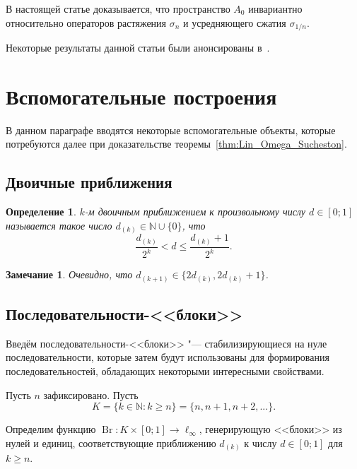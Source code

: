 \documentclass[a4paper,14pt]{article} %
\theoremstyle{plain}
\newtheorem{remark}[lemma]{Замечание}
\newtheorem{definition}[lemma]{Определение}
\begin{document}
В настоящей статье доказывается,
что пространство $A_0$ инвариантно относительно операторов растяжения $\sigma_n$
и усредняющего сжатия $\sigma_{1/n}$.


Некоторые результаты данной статьи были анонсированы в~\cite{our-mz2021linearhulls}.

\section{Вспомогательные построения}

В данном параграфе вводятся некоторые вспомогательные объекты,
которые потребуются далее при доказательстве теоремы~\ref{thm:Lin_Omega_Sucheston}.

\subsection{Двоичные приближения}

\begin{definition}
	$k$-м двоичным приближением к произвольному числу $d\in[0;1]$
	называется такое число $d_{(k)}\in\mathbb{N}\cup\{0\}$,
	что
	\begin{equation}
		\label{eq:binary_approximations_for_number}
		\frac{d_{(k)}}{2^k} < d \leq \frac{d_{(k)}+1}{2^k}
		.
	\end{equation}
\end{definition}

\begin{remark}
	Очевидно, что $d_{(k+1)}\in\{2d_{(k)},2d_{(k)}+1\}$.
\end{remark}

\subsection{Последовательности-<<блоки>>}

Введём последовательности-<<блоки>> "---
стабилизирующиеся на нуле последовательности,
которые затем будут использованы для формирования последовательностей,
обладающих некоторыми интересными свойствами.

Пусть $n$ зафиксировано.
Пусть
\begin{equation}
	K = \{k\in\mathbb{N} : k \geq n\} = \{n, n+1, n+2, ...\}
	.
\end{equation}


Определим функцию $\operatorname{Br}:K\times [0;1] \to \ell_\infty$,
генерирующую <<блоки>> из нулей и единиц,
соответствующие приближению $d_{(k)}$ к числу $d\in[0;1]$ для $k \geq n$.
\end{document}
